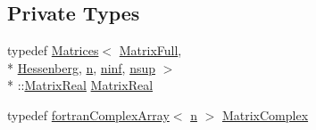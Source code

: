 \subsection*{Private Types}
\begin{DoxyCompactItemize}
\item 
typedef \hyperlink{classodes_1_1Matrices}{Matrices}$<$ \hyperlink{classodes_1_1Rodascc_a6fb3605e3784360a5cc4519dbb72464e}{Matrix\-Full}, \\*
\hyperlink{classodes_1_1Rodascc_ab0e70822d886ddc3019ffa890e38cbfc}{Hessenberg}, \hyperlink{classodes_1_1Rodascc_a7a4cb0d10f0154fed837031863bb491d}{n}, \hyperlink{classodes_1_1Rodascc_a72b21cd42a31626c76d828b56ba50c7f}{ninf}, \hyperlink{classodes_1_1Rodascc_a94122fb8af91d10037aa1206765cfcef}{nsup} $>$\\*
\-::\hyperlink{classodes_1_1Rodascc_a60e15e5d87729cc221d2181ecf03d0f8}{Matrix\-Real} \hyperlink{classodes_1_1Rodascc_a60e15e5d87729cc221d2181ecf03d0f8}{Matrix\-Real}
\item 
typedef \hyperlink{classodes_1_1fortranComplexArray}{fortran\-Complex\-Array}$<$ \hyperlink{classodes_1_1Rodascc_a7a4cb0d10f0154fed837031863bb491d}{n} $>$ \hyperlink{classodes_1_1Matrices_aa1313b5ab7fdab6f5320c8d5aa3bfc24}{Matrix\-Complex}
\end{DoxyCompactItemize}

